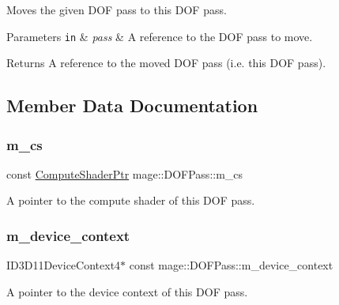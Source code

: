 Moves the given D\+OF pass to this D\+OF pass.


\begin{DoxyParams}[1]{Parameters}
\mbox{\tt in}  & {\em pass} & A reference to the D\+OF pass to move. \\
\hline
\end{DoxyParams}
\begin{DoxyReturn}{Returns}
A reference to the moved D\+OF pass (i.\+e. this D\+OF pass). 
\end{DoxyReturn}


\subsection{Member Data Documentation}
\hypertarget{classmage_1_1_d_o_f_pass_a409baa8803ef547b52ccf28233aca117}{}\label{classmage_1_1_d_o_f_pass_a409baa8803ef547b52ccf28233aca117} 
\subsubsection{\texorpdfstring{m\+\_\+cs}{m\_cs}}
{\footnotesize\ttfamily const \hyperlink{namespacemage_a95ee75d4d07106395d80f751d364dc1b}{Compute\+Shader\+Ptr} mage\+::\+D\+O\+F\+Pass\+::m\+\_\+cs\hspace{0.3cm}{\ttfamily [private]}}

A pointer to the compute shader of this D\+OF pass. \hypertarget{classmage_1_1_d_o_f_pass_a4f0255efe5c79a597462c1535675290e}{}\label{classmage_1_1_d_o_f_pass_a4f0255efe5c79a597462c1535675290e} 
\subsubsection{\texorpdfstring{m\+\_\+device\+\_\+context}{m\_device\_context}}
{\footnotesize\ttfamily I\+D3\+D11\+Device\+Context4$\ast$ const mage\+::\+D\+O\+F\+Pass\+::m\+\_\+device\+\_\+context\hspace{0.3cm}{\ttfamily [private]}}

A pointer to the device context of this D\+OF pass. 